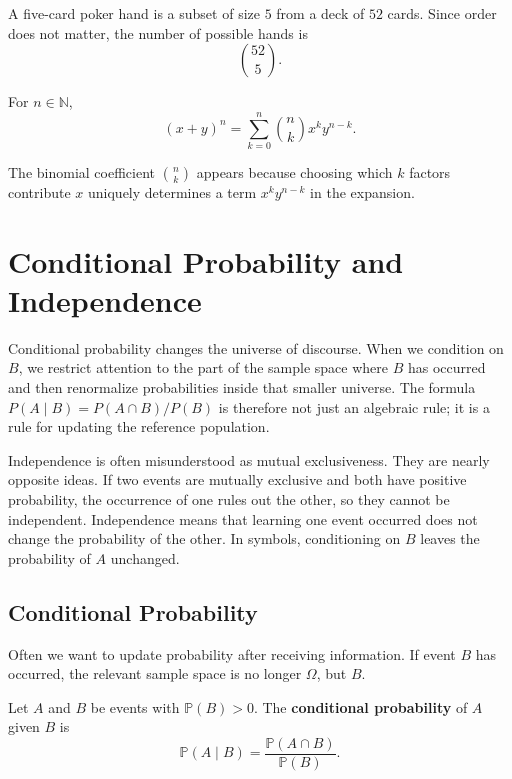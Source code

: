 \begin{example}
A five-card poker hand is a subset of size $5$ from a deck of $52$ cards. Since order does not matter, the number of possible hands is
\[
    \binom{52}{5}.
\]
\end{example}

\begin{theorem}
For $n\in\mathbb{N}$,
\[
    (x+y)^n=\sum_{k=0}^{n}\binom{n}{k}x^k y^{n-k}.
\]
\end{theorem}

\begin{remark}
The binomial coefficient $\binom{n}{k}$ appears because choosing which $k$ factors contribute $x$ uniquely determines a term $x^k y^{n-k}$ in the expansion.
\end{remark}

\section{Conditional Probability and Independence}


Conditional probability changes the universe of discourse. When we condition on $B$, we restrict attention to the part of the sample space where $B$ has occurred and then renormalize probabilities inside that smaller universe. The formula $P(A\mid B)=P(A\cap B)/P(B)$ is therefore not just an algebraic rule; it is a rule for updating the reference population.

Independence is often misunderstood as mutual exclusiveness. They are nearly opposite ideas. If two events are mutually exclusive and both have positive probability, the occurrence of one rules out the other, so they cannot be independent. Independence means that learning one event occurred does not change the probability of the other. In symbols, conditioning on $B$ leaves the probability of $A$ unchanged.

\subsection{Conditional Probability}

Often we want to update probability after receiving information. If event $B$ has occurred, the relevant sample space is no longer $\Omega$, but $B$.

\begin{definition}
Let $A$ and $B$ be events with $\mathbb{P}(B)>0$. The \textbf{conditional probability} of $A$ given $B$ is
\[
    \mathbb{P}(A\mid B)=\frac{\mathbb{P}(A\cap B)}{\mathbb{P}(B)}.
\]
\end{definition}

